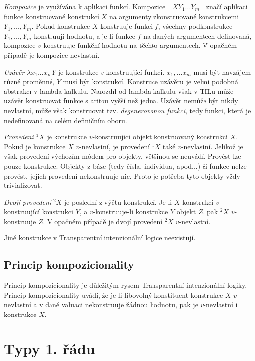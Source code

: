 \textit{Kompozice} je využívána k aplikaci funkcí. Kompozice $[X Y_1...Y_m]$ značí aplikaci funkce
konstruované konstrukcí $X$ na argumenty zkonstruované konstrukcemi $Y_1,...,Y_m$. Pokud konstrukce
$X$ konstruuje funkci $f$, všechny podkonstrukce $Y_1,...,Y_m$ konstruují hodnotu, a je-li funkce
$f$ na daných argumentech definovaná, kompozice $v$-konstruuje funkční hodnotu na těchto
argumentech. V opačném případě je kompozice nevlastní.

\textit{Uzávěr} $\lambda x_1...x_m Y$ je konstrukce $v$-konstruující funkci. $x_1,...x_m$ musí
být navzájem různé proměnné, $Y$ musí být konstrukcí. Konstruce uzávěru je velmi podobná abstrakci
v lambda kalkulu. Narozdíl od lambda kalkulu však v TILu může uzávěr konstruovat funkce s aritou
vyšší než jedna. Uzávěr nemůže být nikdy nevlastní, může však konstruovat tzv.
\textit{degenerovanou funkci}, tedy funkci, která je nedefinovaná na celém definičním oboru.

\textit{Provedení} ${}^1X$ je konstrukce $v$-konstruující objekt konstruovaný konstrukcí $X$.
Pokud je konstrukce $X$ $v$-nevlastní, je provedení ${}^1X$ také $v$-nevlastní. Jelikož je však
provedení výchozím módem pro objekty, většinou se neuvádí. Provést lze pouze konstrukce. Objekty
z báze (tedy čísla, individua, apod...) či funkce nelze provést, jejich provedení nekonstruuje nic.
Proto je potřeba tyto objekty vždy trivializovat.

\textit{Dvojí provedení} ${}^2X$ je poslední z výčtu konstrukcí. Je-li $X$ konstrukcí
$v$-konstruující konstrukci $Y$, a $v$-konstruuje-li konstrukce $Y$ objekt $Z$, pak ${}^2X$
$v$-konstruuje $Z$. V opačném případě je dvojí provedení ${}^2X$ $v$-nevlastní.

Jiné konstrukce v Transparentní intenzionální logice neexistují.

\subsection{Princip kompozicionality} 

Princip kompozicionality je důležitým rysem Transparentní intenzionální logiky. Princip
kompozicionality uvádí, že je-li libovolný konstituent konstrukce $X$ $v$-nevlastní a v dané
valuaci nekonstruuje žádnou hodnotu, pak je $v$-nevlastní i konstrukce $X$.

\section{Typy 1. řádu}

